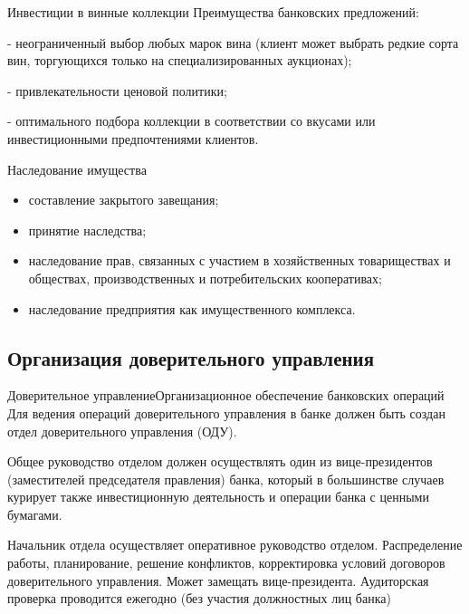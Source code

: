\documentclass[_Banking_p3.tex]{subfiles}
\begin{document}
\begin{frame}{Инвестиции в винные коллекции}
Преимущества банковских предложений:

- неограниченный выбор любых марок вина (клиент может выбрать редкие сорта вин, торгующихся только на специализированных аукционах);

- привлекательности ценовой политики;

- оптимального подбора коллекции в соответствии со вкусами или инвестиционными предпочтениями клиентов.

\end{frame}


\begin{frame}{Наследование имущества}
\begin{itemize}[<+->]
\item
составление закрытого завещания;

\item
принятие наследства;

\item
наследование прав, связанных с участием в хозяйственных товариществах и обществах, производственных и потребительских кооперативах;

\item
наследование предприятия как имущественного комплекса.

\end{itemize}

\end{frame}

\subsection{Организация доверительного управления}
\begin{frame} [ allowframebreaks]{Доверительное управление}{Организационное обеспечение банковских операций}
Для ведения операций доверительного управления в банке должен быть создан отдел доверительного управления (ОДУ).

Общее руководство отделом должен осуществлять один из вице-президентов (заместителей председателя правления) банка, который в большинстве случаев курирует также инвестиционную деятельность и операции банка с ценными бумагами. 

\pagebreak
Начальник отдела осуществляет оперативное руководство отделом. Распределение работы, планирование, решение конфликтов, корректировка условий договоров доверительного управления. Может замещать вице-президента. Аудиторская проверка проводится ежегодно (без участия должностных лиц банка)
\end{frame}
\end{document}
